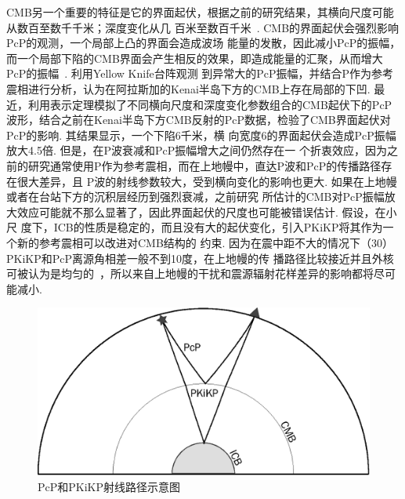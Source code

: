 CMB另一个重要的特征是它的界面起伏，根据之前的研究结果，其横向尺度可能从数百至数千千米；深度变化从几
百米至数百千米~\citep{Earle1997,Sze200327}. CMB的界面起伏会强烈影响PcP的观测，一个局部上凸的界面会造成波场
能量的发散，因此减小PcP的振幅，而一个局部下陷的CMB界面会产生相反的效果，即造成能量的汇聚，从而增大PcP的振幅~\citep{Kampfmann1989a,Neuberg1991}. \citet{Rost2004a}利用Yellow Knife台阵观测
到异常大的PcP振幅，并结合P作为参考震相进行分析，认为在阿拉斯加的Kenai半岛下方的CMB上存在局部的下凹. 最近，\cite{Wu2014a}利用表示定理模拟了不同横向尺度和深度变化参数组合的CMB起伏下的PcP
波形，结合之前在Kenai半岛下方CMB反射的PcP数据，检验了CMB界面起伏对PcP的影响. 其结果显示，一个下陷6千米，横
向宽度6{\textdegree}的界面起伏会造成PcP振幅放大4.5倍. 但是，在P波衰减和PcP振幅增大之间仍然存在一
个折衷效应，因为之前的研究通常使用P作为参考震相，而在上地幔中，直达P波和PcP的传播路径存在很大差异，且
P波的射线参数较大，受到横向变化的影响也更大. 如果在上地幔或者在台站下方的沉积层经历到强烈衰减，之前研究
所估计的CMB对PcP振幅放大效应可能就不那么显著了，因此界面起伏的尺度也可能被错误估计. 假设，在小尺
度下，ICB的性质是稳定的，而且没有大的起伏变化，引入PKiKP将其作为一个新的参考震相可以改进对CMB结构的
约束. 因为在震中距不大的情况下（30{\textdegree}）PKiKP和PcP离源角相差一般不到10度，在上地幔的传
播路径比较接近并且外核可被认为是均匀的~\citep{Stevenson01011987}，所以来自上地幔的干扰和震源辐射花样差异的影响都将尽可能减小. 

\begin{figure}
\centering
\includegraphics[width=0.7\linewidth]{fig/chap1/ray_path}
\caption{PcP和PKiKP射线路径示意图}
\label{fig:ray_path}
\end{figure}

